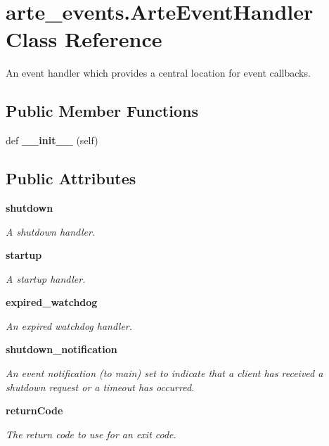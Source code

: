 \section{arte\+\_\+events.\+Arte\+Event\+Handler Class Reference}
\label{classarte__events_1_1_arte_event_handler}


An event handler which provides a central location for event callbacks.  


\subsection*{Public Member Functions}
\begin{DoxyCompactItemize}
\item 
def {\bfseries \+\_\+\+\_\+init\+\_\+\+\_\+} (self)\label{classarte__events_1_1_arte_event_handler_af535e4b9e54118d42a007c8a94722b48}

\end{DoxyCompactItemize}
\subsection*{Public Attributes}
\begin{DoxyCompactItemize}
\item 
{\bf shutdown}
\begin{DoxyCompactList}\small\item\em A shutdown handler. \end{DoxyCompactList}\item 
{\bf startup}
\begin{DoxyCompactList}\small\item\em A startup handler. \end{DoxyCompactList}\item 
{\bf expired\+\_\+watchdog}
\begin{DoxyCompactList}\small\item\em An expired watchdog handler. \end{DoxyCompactList}\item 
{\bf shutdown\+\_\+notification}
\begin{DoxyCompactList}\small\item\em An event notification (to main) set to indicate that a client has received a shutdown request or a timeout has occurred. \end{DoxyCompactList}\item 
{\bf return\+Code}
\begin{DoxyCompactList}\small\item\em The return code to use for an exit code. \end{DoxyCompactList}\end{DoxyCompactItemize}


